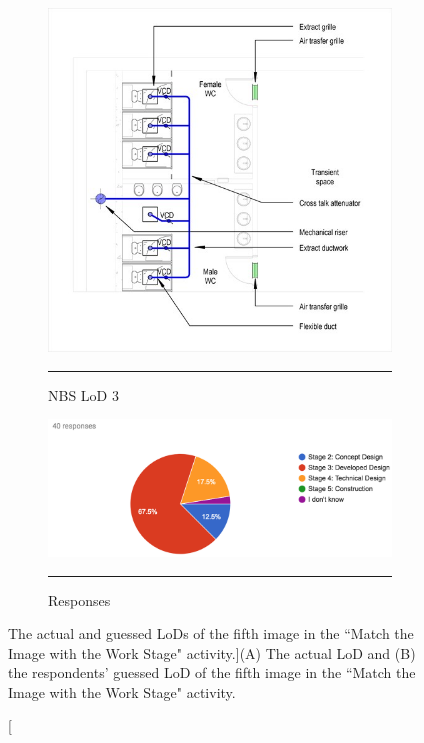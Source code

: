 \begin{figure}[htbp]
\centering
  \begin{subfigure}[b]{.35\textwidth}
  \centering
  \includegraphics[width=\textwidth]{figures/local-exhaust-vent-syst.jpg}
		\rule{\textwidth}{0.5pt} %
  \caption{NBS LoD 3}
  \label{}
\end{subfigure}
  \begin{subfigure}[b]{.61\textwidth}
  \centering
  \includegraphics[width=\textwidth]{figures/image5.png}
		\rule{\textwidth}{0.5pt} %
  \caption{Responses}
  \label{}
\end{subfigure}
\caption[The actual and guessed LoDs of the fifth image in the ``Match the Image with the Work Stage" activity.]{({\scriptsize A}) The actual LoD and ({\scriptsize B}) the respondents’ guessed LoD of the fifth image in the ``Match the Image with the Work Stage" activity.}
\label{image5}
\end{figure}



